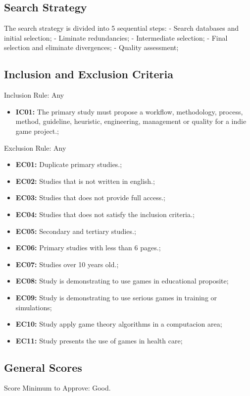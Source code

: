\documentclass [11pt]{article}
\begin{document}
\subsection{Search Strategy}
  The search strategy is divided into 5 sequential steps:
- Search  databases  and  initial  selection;
- Liminate redundancies;
- Intermediate selection;
- Final selection and eliminate divergences;
- Quality assessment;

\subsection{Inclusion and Exclusion Criteria}
Inclusion Rule: Any

\begin{itemize}
\item \textbf{IC01: }The primary study must propose a workflow, methodology, process, method, guideline, heuristic, engineering, management or quality	 for a indie game project.;
\end{itemize}

Exclusion Rule: Any

\begin{itemize}
\item \textbf{EC01: }Duplicate primary studies.;
\item \textbf{EC02: }Studies that is not written in english.;
\item \textbf{EC03: }Studies that does not provide full access.;
\item \textbf{EC04: }Studies that does not satisfy the inclusion criteria.;
\item \textbf{EC05: }Secondary and tertiary studies.;
\item \textbf{EC06: }Primary studies with less than 6 pages.;
\item \textbf{EC07: }Studies over 10 years old.;
\item \textbf{EC08: }Study is demonstrating to use games in educational proposite;
\item \textbf{EC09: }Study is demonstrating to use serious games in training or simulations;
\item \textbf{EC10: }Study apply game theory algorithms in a computacion area;
\item \textbf{EC11: }Study presents the use of games in health care;
\end{itemize}

\subsection{General Scores}
Score Minimum to Approve: Good.
\end{document}
